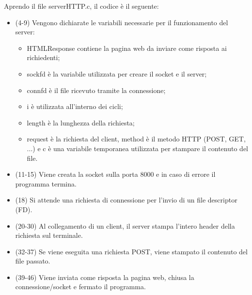 \documentclass[a4paper]{article}
\begin{document}
	\noindent
	Aprendo il file \textsf{serverHTTP.c}, il codice è il seguente:
	
	\begin{itemize}
		\item (4-9) Vengono dichiarate le variabili necessarie per il funzionamento del server:
		\begin{itemize}
			\item \textsf{HTMLResponse} contiene la pagina web da inviare come risposta ai richiedenti;
			
			\item \textsf{sockfd} è la variabile utilizzata per creare il socket e il server;
			
			\item \textsf{connfd} è il file ricevuto tramite la connessione;
			
			\item \textsf{i} è utilizzata all'interno dei cicli;
			
			\item \textsf{length} è la lunghezza della richiesta;
			
			\item \textsf{request} è la richiesta del client, \textsf{method} è il metodo HTTP (POST, GET, ...) e \textsf{c} è una variabile temporanea utilizzata per stampare il contenuto del file.
		\end{itemize}
		
		\item (11-15) Viene creata la socket sulla porta 8000 e in caso di errore il programma termina.
		
		\item (18) Si attende una richiesta di connessione per l'invio di un file descriptor (FD).
		
		\item (20-30) Al collegamento di un client, il server stampa l'intero header della richiesta sul terminale.
		
		\item (32-37) Se viene eseguita una richiesta POST, viene stampato il contenuto del file passato.
		
		\item (39-46) Viene inviata come risposta la pagina web, chiusa la connessione/socket e fermato il programma.
	\end{itemize}\newpage
	
\end{document}

